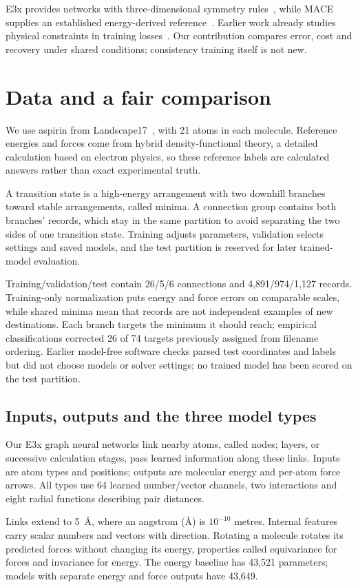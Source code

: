 \documentclass{article}
\begin{document}
E3x provides networks with three-dimensional symmetry rules~\cite{e3x}, while MACE supplies an established energy-derived reference~\cite{mace}. Earlier work already studies physical constraints in training losses~\cite{takamoto}. Our contribution compares error, cost and recovery under shared conditions; consistency training itself is not new.

\section{Data and a fair comparison}
We use aspirin from Landscape17~\cite{landscape}, with 21 atoms in each molecule. Reference energies and forces come from hybrid density-functional theory, a detailed calculation based on electron physics, so these reference labels are calculated answers rather than exact experimental truth.

A transition state is a high-energy arrangement with two downhill branches toward stable arrangements, called minima. A connection group contains both branches' records, which stay in the same partition to avoid separating the two sides of one transition state. Training adjusts parameters, validation selects settings and saved models, and the test partition is reserved for later trained-model evaluation.

Training/validation/test contain 26/5/6 connections and 4,891/974/1,127 records. Training-only normalization puts energy and force errors on comparable scales, while shared minima mean that records are not independent examples of new destinations. Each branch targets the minimum it should reach; empirical classifications corrected 26 of 74 targets previously assigned from filename ordering. Earlier model-free software checks parsed test coordinates and labels but did not choose models or solver settings; no trained model has been scored on the test partition.
\subsection{Inputs, outputs and the three model types}
Our E3x graph neural networks link nearby atoms, called nodes; layers, or successive calculation stages, pass learned information along these links. Inputs are atom types and positions; outputs are molecular energy and per-atom force arrows. All types use 64 learned number/vector channels, two interactions and eight radial functions describing pair distances.

Links extend to 5~\AA, where an angstrom (\AA) is $10^{-10}$ metres. Internal features carry scalar numbers and vectors with direction. Rotating a molecule rotates its predicted forces without changing its energy, properties called equivariance for forces and invariance for energy. The energy baseline has 43,521 parameters; models with separate energy and force outputs have 43,649.
\end{document}
